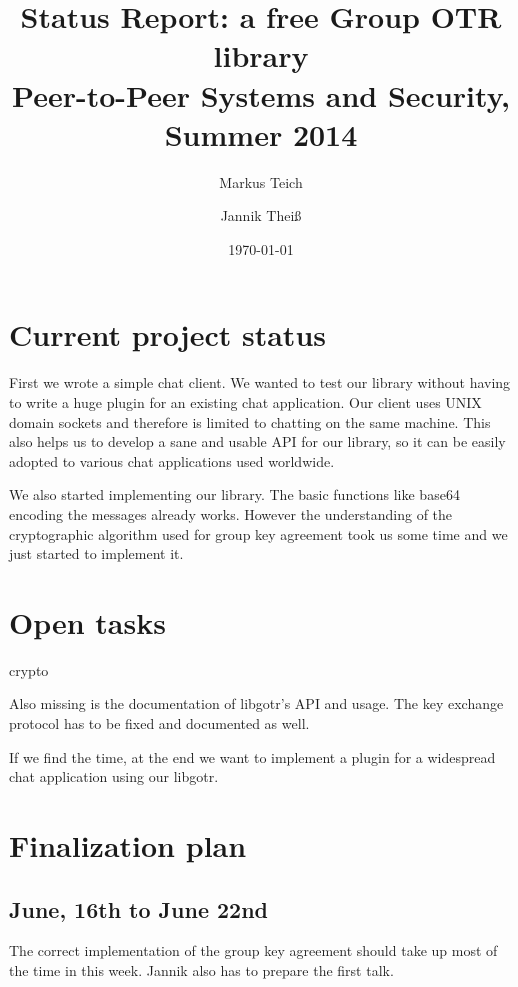 

\title{Status Report: a free Group OTR library \\ {\small Peer-to-Peer Systems and Security, Summer 2014}}
\author{
	Markus Teich
	\and
	Jannik Theiß
}
\date{\today}



\maketitle


\section{Current project status}

First we wrote a simple chat client. We wanted to test our library without
having to write a huge plugin for an existing chat application. Our client uses
UNIX domain sockets and therefore is limited to chatting on the same machine.
This also helps us to develop a sane and usable API for our library, so it can
be easily adopted to various chat applications used worldwide.

We also started implementing our library. The basic functions like base64
encoding the messages already works. However the understanding of the
cryptographic algorithm used for group key agreement took us some time and we
just started to implement it.

\section{Open tasks}

crypto

Also missing is the documentation of libgotr's API and usage. The key exchange
protocol has to be fixed and documented as well.

If we find the time, at the end we want to implement a plugin for a widespread
chat application using our libgotr.

\section{Finalization plan}

\subsection{June, 16th to June 22nd}

The correct implementation of the group key agreement should take up most of the
time in this week. Jannik also has to prepare the first talk.

